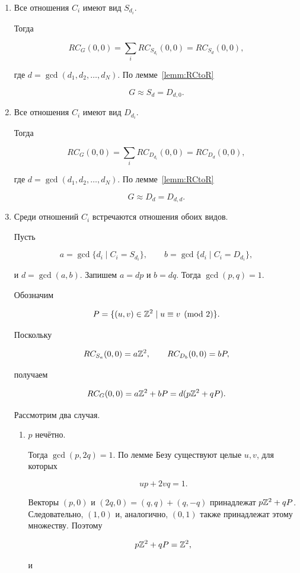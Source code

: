 \begin{enumerate}
    \item Все отношения $C_i$ имеют вид $S_{d_i}$.

    Тогда

    $$RC_G(0,0)=\sum\limits_i RC_{S_{d_i}}(0,0)
    =RC_{S_d}(0,0),$$

    где $d=\gcd(d_1,d_2,\dots,d_N)$. По
    лемме~\ref{lemm:RCtoR}

    $$G\approx S_d=D_{d,0}.$$

    \item Все отношения $C_i$ имеют вид $D_{d_i}$.

    Тогда

    $$RC_G(0,0)=\sum\limits_i RC_{D_{d_i}}(0,0)
    =RC_{D_d}(0,0),$$

    где $d=\gcd(d_1,d_2,\dots,d_N)$. По
    лемме~\ref{lemm:RCtoR}

    $$G\approx D_d=D_{d,d}.$$

    \item Среди отношений $C_i$ встречаются отношения обоих видов.

    Пусть

    $$a=\gcd\{d_i\mid C_i=S_{d_i}\},\qquad
    b=\gcd\{d_i\mid C_i=D_{d_i}\},$$

    и $d=\gcd(a,b)$. Запишем $a=dp$ и $b=dq$. Тогда
    $\gcd(p,q)=1$.

    Обозначим

    $$P=\{(u,v)\in\mathbb{Z}^2\mid u\equiv v\pmod 2\}.$$

    Поскольку

    $$RC_{S_a}(0,0)=a\mathbb{Z}^2,\qquad RC_{D_b}(0,0)=bP,$$

    получаем

    $$RC_G(0,0)=a\mathbb{Z}^2+bP=d(p\mathbb{Z}^2+qP).$$

    Рассмотрим два случая.

    \begin{enumerate}
        \item $p$ нечётно.

        Тогда $\gcd(p,2q)=1$. По лемме Безу существуют целые $u,v$, для
        которых

        $$up+2vq=1.$$

        Векторы $(p,0)$ и $(2q,0)=(q,q)+(q,-q)$ принадлежат
        $p\mathbb{Z}^2+qP$. Следовательно, $(1,0)$ и, аналогично, $(0,1)$ также
        принадлежат этому множеству. Поэтому

        $$p\mathbb{Z}^2+qP=\mathbb{Z}^2,$$

        и


\end{enumerate}
\end{enumerate}
